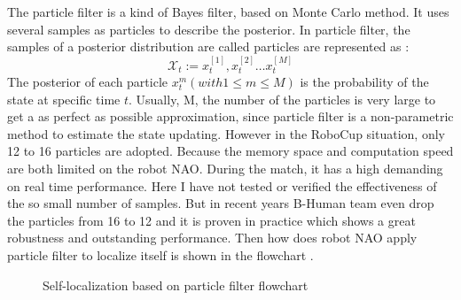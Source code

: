 The particle filter is a kind of Bayes filter, based on Monte Carlo method. It uses several samples as particles to describe the posterior. In particle filter, the samples of a posterior distribution are called particles are represented as \cite{thrun2005probabilistic}: 
\[
\mathcal{X}_t:=x_t^{[1]},x_t^{[2]} \dots x_t^{[M]}
\]
The posterior of each particle $x_t^{m} (with 1 \leq m \leq M)$ is the probability of the state at specific time $t$. Usually, M, the number of the particles is very large to get a as perfect as possible approximation, since particle filter is a non-parametric method to estimate the state updating. However in the RoboCup situation, only 12 to 16 particles are adopted. Because the memory space and computation speed are both limited on the robot NAO. During the match, it has a high demanding on real time performance. Here I have not tested or verified the effectiveness of the so small number of samples. But in recent years B-Human team even drop the particles from 16 to 12 \cite{BHumanCodeRelease2010} and it is proven in practice which shows a great robustness and outstanding performance. Then how does robot NAO apply particle filter to localize itself is shown in the flowchart .
\begin{figure}[tbp]
\centering
{}
\caption{Self-localization based on particle filter flowchart}
\label{ffc}
\end{figure}

